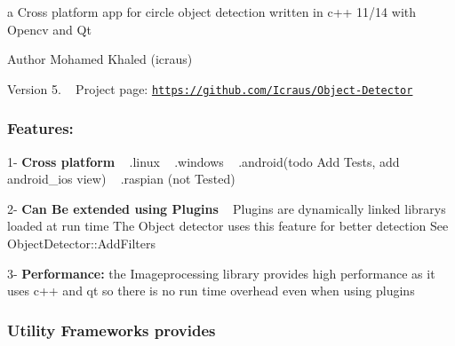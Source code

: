 a Cross platform app for circle object detection written in c++ 11/14 with Opencv and Qt \begin{DoxyAuthor}{Author}
Mohamed Khaled (icraus) 
\end{DoxyAuthor}
\begin{DoxyVersion}{Version}
5. ~\newline
 Project page\+: \href{https://github.com/Icraus/Object-Detector}{\tt https\+://github.\+com/\+Icraus/\+Object-\/\+Detector}
\end{DoxyVersion}
\subsubsection*{Features\+:}

1-\/ {\bfseries  Cross platform} ~\newline
.linux ~\newline
.windows ~\newline
.android(todo Add Tests, add android\+\_\+ios view) ~\newline
.raspian (not Tested)

2-\/ {\bfseries  Can Be extended using Plugins} ~\newline
Plugins are dynamically linked librarys loaded at run time The Object detector uses this feature for better detection See Object\+Detector\+::\+Add\+Filters

3-\/ {\bfseries Performance\+:} the Imageprocessing library provides high performance as it uses c++ and qt so there is no run time overhead even when using plugins

\subsubsection*{Utility Frameworks provides}

